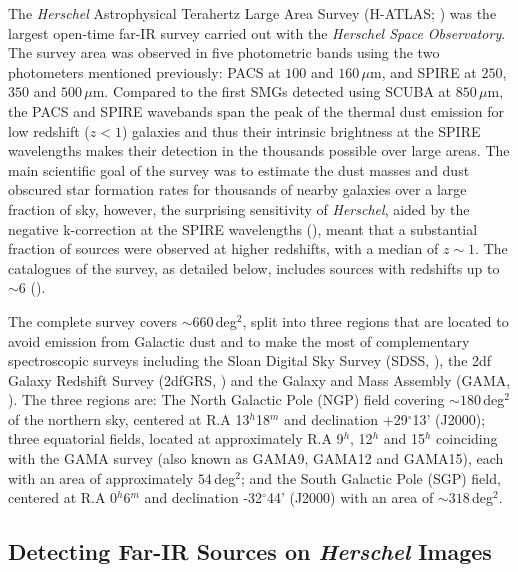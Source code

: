 The \textit{Herschel} Astrophysical Terahertz Large Area Survey (H-ATLAS; \citealt{Eales_2010}) was the largest open-time far-IR survey carried out with the \textit{Herschel Space Observatory}. The survey area was observed in five photometric bands using the two photometers mentioned previously: PACS at $100$ and $160\,\mu$m, and SPIRE at $250$, $350$ and $500\,\mu$m. Compared to the first SMGs detected using SCUBA at $850\,\mu$m, the PACS and SPIRE wavebands span the peak of the thermal dust emission for low redshift ($z < 1$) galaxies and thus their intrinsic brightness at the SPIRE wavelengths makes their detection in the thousands possible over large areas. The main scientific goal of the survey was to estimate the dust masses and dust obscured star formation rates for thousands of nearby galaxies over a large fraction of sky, however, the surprising sensitivity of \textit{Herschel}, aided by the negative k-correction at the SPIRE wavelengths (\citealt{Blain_1993}), meant that a substantial fraction of sources were observed at higher redshifts, with a median of $z \sim 1$. The catalogues of the survey, as detailed below, includes sources with redshifts up to $\sim 6$ (\citealt{Amblard_2010, Lapi_2011, Fudamoto_2017, Zavala_2018}).

The complete survey covers $\sim 660\,$deg$^2$, split into three regions that are located to avoid emission from Galactic dust and to make the most of complementary spectroscopic surveys including the Sloan Digital Sky Survey (SDSS, \citealt{York_2000}), the 2df Galaxy Redshift Survey (2dfGRS, \citealt{Colless_2001}) and the Galaxy and Mass Assembly (GAMA, \citealt{Driver_2009}). The three regions are: The North Galactic Pole (NGP) field covering $\sim 180\,$deg$^2$ of the northern sky, centered at R.A 13$^{h}$18$^{m}$ and declination +29$^{\circ}$13' (J2000); three equatorial fields, located at approximately R.A 9$^{h}$, 12$^{h}$ and 15$^{h}$ coinciding with the GAMA survey (also known as GAMA9, GAMA12 and GAMA15), each with an area of approximately $54\,$deg$^2$; and the South Galactic Pole (SGP) field, centered at R.A 0$^{h}$6$^{m}$ and declination -32$^{\circ}$44' (J2000) with an area of $\sim 318\,$deg$^2$. 

\subsection{Detecting Far-IR Sources on \textit{Herschel} Images}
\label{sec:Detecting Submillimeter Sources on Herschel Images}

